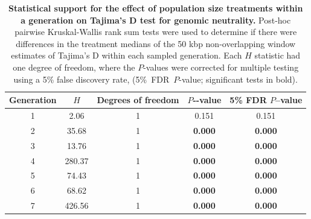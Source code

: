 \begin{table}[!b]
\renewcommand{\arraystretch}{1.3}
\begin{center}
\caption[Statistical support for the effect of population size treatments within a generation on Tajima’s D test for genomic neutrality.]{\textbf{Statistical support for the effect of population size treatments within a generation on Tajima’s D test for genomic neutrality.} Post-hoc pairwise Kruskal-Wallis rank sum tests were used to determine if there were differences in the treatment medians of the 50 kbp non-overlapping window estimates of Tajima’s D within each sampled generation. Each $H$ statistic had one degree of freedom, where the $P$-values were corrected for multiple testing using a 5\% false discovery rate, (5\%~FDR~$P$-value; significant tests in bold).}
\label{tab:DNAsuppKruskalW}
\begin{tabular}{cS[table-format=3.2]cS[table-format=1.3]S[table-format=1.3]}
\toprule
\textbf{Generation}	& \bfseries{$H$} & \textbf{Degrees of freedom}	& \textbf{$P$-{}-value} & \textbf{5\% FDR $P$--value} \\
	& 2.06	& 1	& 0.151	             & 0.151\\
2	& 35.68	& 1	& \textbf{0.000}	& \textbf{0.000}\\
3	& 13.76	& 1	& \textbf{0.000}	& \textbf{0.000}\\
4	& 280.37 &	1	& \textbf{0.000}	& \textbf{0.000}\\
5	& 74.43	& 1 	& \textbf{0.000}	& \textbf{0.000}\\
6	& 68.62	& 1	& \textbf{0.000}	& \textbf{0.000}\\
7	& 426.56 &	1	& \textbf{0.000}	& \textbf{0.000}\\
\bottomrule
\end{tabular}
\end{center}
\end{table}

